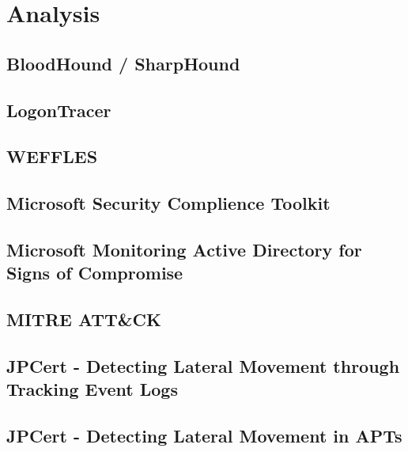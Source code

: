 \section{Analysis}

\subsection{BloodHound / SharpHound}

\subsection{LogonTracer}

\subsection{WEFFLES}

\subsection{Microsoft Security Complience Toolkit}

\subsection{Microsoft Monitoring Active Directory for Signs of Compromise}

\subsection{MITRE ATT\&CK}

\subsection{JPCert - Detecting Lateral Movement through Tracking Event Logs}

\subsection{JPCert - Detecting Lateral Movement in APTs}
